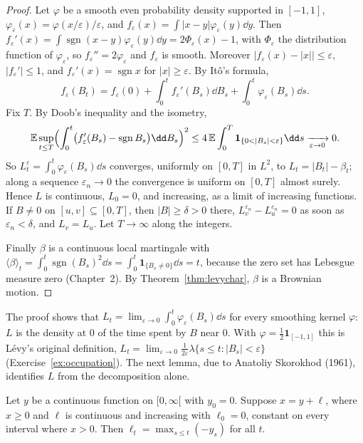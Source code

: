 \begin{proof}
Let $\varphi$ be a smooth even probability density supported in $[-1,1]$, $\varphi_\varepsilon(x)=\varphi(x/\varepsilon)/\varepsilon$, and $f_\varepsilon(x)=\int|x-y|\varphi_\varepsilon(y)\dd y$. Then $f_\varepsilon'(x)=\int\operatorname{sgn}(x-y)\varphi_\varepsilon(y)\dd y=2\Phi_\varepsilon(x)-1$,
with $\Phi_\varepsilon$ the distribution function of $\varphi_\varepsilon$, so $f_\varepsilon''=2\varphi_\varepsilon$ and $f_\varepsilon$ is smooth. Moreover $|f_\varepsilon(x)-|x||\le\varepsilon$, $|f_\varepsilon'|\le1$, and $f_\varepsilon'(x)=\operatorname{sgn}x$ for $|x|\ge\varepsilon$. By
It\^o's formula,
\[
f_\varepsilon(B_t)=f_\varepsilon(0)+\int_0^tf_\varepsilon'(B_s)\dd B_s+\int_0^t\varphi_\varepsilon(B_s)\dd s .
\]
Fix $T$. By Doob's inequality and the isometry,
\[
\mathbb E\sup_{t\le T}\Bigl(\int_0^t\bigl(f_\varepsilon'(B_s)-\operatorname{sgn}B_s\bigr)\dd B_s\Bigr)^2\le4\,\mathbb E\int_0^T\mathbf 1_{\{0<|B_s|<\varepsilon\}}\dd s\xrightarrow[\varepsilon\to0]{}0 .
\]
So $L^\varepsilon_t=\int_0^t\varphi_\varepsilon(B_s)\dd s$ converges, uniformly on $[0,T]$ in $L^2$, to $L_t=|B_t|-\beta_t$; along a sequence $\varepsilon_n\to0$ the convergence is uniform on $[0,T]$ almost surely. Hence $L$ is continuous,
$L_0=0$, and increasing, as a limit of increasing functions. If $B\ne0$ on $[u,v]\subseteq[0,T]$, then $|B|\ge\delta>0$ there, $L^{\varepsilon_n}_v-L^{\varepsilon_n}_u=0$ as soon as $\varepsilon_n<\delta$, and $L_v=L_u$. Let $T\to\infty$
along the integers.

Finally $\beta$ is a continuous local martingale with $\langle\beta\rangle_t=\int_0^t\operatorname{sgn}(B_s)^2\dd s=\int_0^t\mathbf 1_{\{B_s\ne0\}}\dd s=t$, because the zero set has Lebesgue measure zero (Chapter~2). By
Theorem~\ref{thm:levychar}, $\beta$ is a Brownian motion.
\end{proof}

The proof shows that $L_t=\lim_{\varepsilon\to0}\int_0^t\varphi_\varepsilon(B_s)\dd s$ for every smoothing kernel $\varphi$: $L$ is the density at $0$ of the time spent by $B$ near $0$. With $\varphi=\frac12\mathbf 1_{[-1,1]}$ this is L\'evy's
original definition, $L_t=\lim_{\varepsilon\to0}\frac1{2\varepsilon}\lambda\{s\le t:|B_s|<\varepsilon\}$ (Exercise~\ref{ex:occupation}). The next lemma, due to Anatoliy Skorokhod (1961), identifies $L$ from the decomposition alone.

\begin{lemma}\label{lem:skorokhod}
Let $y$ be a continuous function on $[0,\infty[$ with $y_0=0$. Suppose $x=y+\ell$, where $x\ge0$ and $\ell$ is continuous and increasing with $\ell_0=0$, constant on every interval where $x>0$. Then
$\ell_t=\max_{s\le t}(-y_s)$ for all $t$.
\end{lemma}

